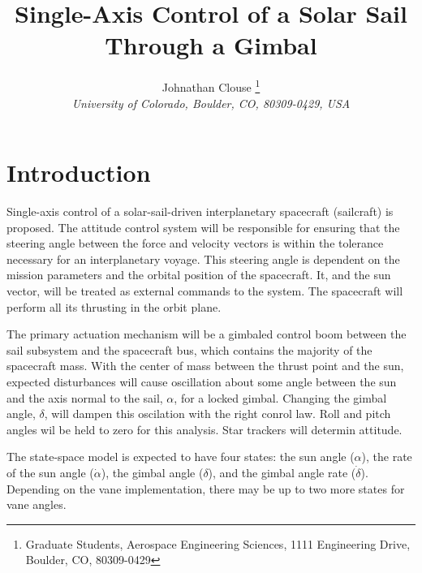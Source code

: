 \documentclass[]{aiaa-tc}%
\title{Single-Axis Control of a Solar Sail Through a Gimbal}
\author{
	Johnathan Clouse%
	\thanks{Graduate Students, Aerospace Engineering Sciences, 1111 Engineering Drive, Boulder, CO, 80309-0429}\\
	{\normalsize\itshape
		University of Colorado, Boulder, CO, 80309-0429, USA}
}
\begin{document}
	

	
	\maketitle
	
	\begin{abstract}
		\noindent 
		
	\end{abstract}
	
	\newpage
	
	\tableofcontents
	
	\newpage

	\section{Introduction}
Single-axis control of a solar-sail-driven interplanetary spacecraft (sailcraft) is proposed.  The attitude control system will be responsible for ensuring that the steering angle between the force and velocity vectors is within the tolerance necessary for an interplanetary voyage.  This steering angle is dependent on the mission parameters and the orbital position of the spacecraft. It, and the sun vector, will be treated as external commands to the system. The spacecraft will perform all its thrusting in the orbit plane.
	
	\vspace{5 mm}
	
The primary actuation mechanism will be a gimbaled control boom between the sail subsystem and the spacecraft bus, which contains the majority of the spacecraft mass.  With the center of mass between the thrust point and the sun, expected disturbances will cause oscillation about some angle between the sun and the axis normal to the sail, $\alpha$, for a locked gimbal.  Changing the gimbal angle, $\delta$, will dampen this oscilation with the right conrol law. Roll and pitch angles wil be held to zero for this analysis. Star trackers will determin attitude.
	
	\vspace{5 mm}

The state-space model is expected to have four states: the sun angle ($\alpha$), the rate of the sun angle ($\dot{\alpha}$), the gimbal angle ($\delta$), and the gimbal angle rate ($\dot{\delta}$).  Depending on the vane implementation, there may be up to two more states for vane angles.
	
	\vspace{5 mm}
\end{document}
